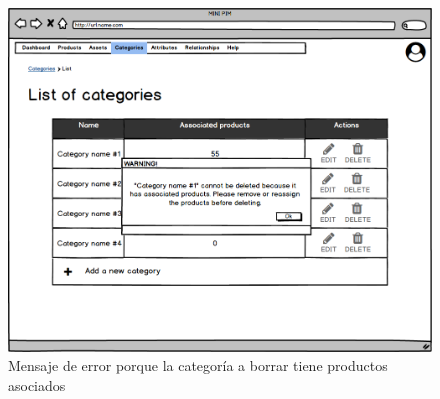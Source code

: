 \begin{figure}[H]
    \includegraphics[width=1\linewidth]{mockups/RF4.4_2.png}
    \caption{Mensaje de error porque la categoría a borrar tiene productos asociados}
   \end{figure}
\vspace{1.0cm}

\newpage %